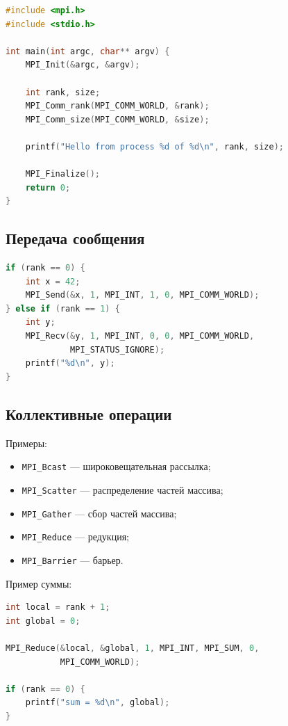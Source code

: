 \documentclass[12pt,a4paper]{article}
\begin{document}
\begin{lstlisting}[language=C]
#include <mpi.h>
#include <stdio.h>

int main(int argc, char** argv) {
    MPI_Init(&argc, &argv);

    int rank, size;
    MPI_Comm_rank(MPI_COMM_WORLD, &rank);
    MPI_Comm_size(MPI_COMM_WORLD, &size);

    printf("Hello from process %d of %d\n", rank, size);

    MPI_Finalize();
    return 0;
}
\end{lstlisting}

\subsection{Передача сообщения}

\begin{lstlisting}[language=C]
if (rank == 0) {
    int x = 42;
    MPI_Send(&x, 1, MPI_INT, 1, 0, MPI_COMM_WORLD);
} else if (rank == 1) {
    int y;
    MPI_Recv(&y, 1, MPI_INT, 0, 0, MPI_COMM_WORLD,
             MPI_STATUS_IGNORE);
    printf("%d\n", y);
}
\end{lstlisting}

\subsection{Коллективные операции}

Примеры:
\begin{itemize}
    \item \texttt{MPI\_Bcast} --- широковещательная рассылка;
    \item \texttt{MPI\_Scatter} --- распределение частей массива;
    \item \texttt{MPI\_Gather} --- сбор частей массива;
    \item \texttt{MPI\_Reduce} --- редукция;
    \item \texttt{MPI\_Barrier} --- барьер.
\end{itemize}

Пример суммы:

\begin{lstlisting}[language=C]
int local = rank + 1;
int global = 0;

MPI_Reduce(&local, &global, 1, MPI_INT, MPI_SUM, 0,
           MPI_COMM_WORLD);

if (rank == 0) {
    printf("sum = %d\n", global);
}
\end{lstlisting}
\end{document}
